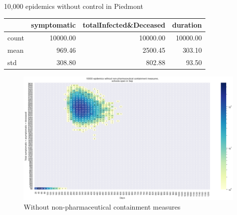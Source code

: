 \documentclass[8pt]{beamer}
\begin{document}
\begin{frame}{10,000 epidemics without control in Piedmont}


\begin{table}[H]
\center
\tiny

\begin{tabular}{lrrr}
\toprule
{} &  symptomatic &  totalInfected\&Deceased &  duration \\
\midrule
count &     10000.00 &                10000.00 &  10000.00 \\
mean  &       969.46 &                 2500.45 &    303.10 \\
std   &       308.80 &                  802.88 &     93.50 \\
\bottomrule
\end{tabular}

\label{noCTab}
\end{table}

\begin{figure}[H]
\center
\includegraphics[scale=0.22]{10kNoControl.png}
\caption{Without non-pharmaceutical containment measures} 
\label{noC}
\end{figure}

\end{frame}
\end{document}

